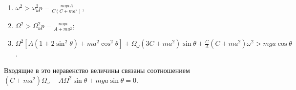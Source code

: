 \begin{enumerate}
	\item $\omega ^2 > \omega ^2_kp = \frac{mgaA}{C(C + ma^2)}$,
	\item $\Omega ^2 > \Omega ^2_kp = \frac{mga}{A + ma^2}$;
	\item $\Omega ^2[A(1 + 2\sin^2{\theta}) + ma^2\cos^2{\theta}]+
	\Omega _{\omega}(3C + ma^2)\sin{\theta} +
	\frac{C}{A}(C + ma^2)\omega ^2 > mga\cos{\theta}$.
\end{enumerate}
Входящие в это неравенство величины связаны соотношением
$(C + ma^2)\Omega _{\omega} - A\Omega ^2\sin{\theta}+
mga\sin{\theta} = 0$.
